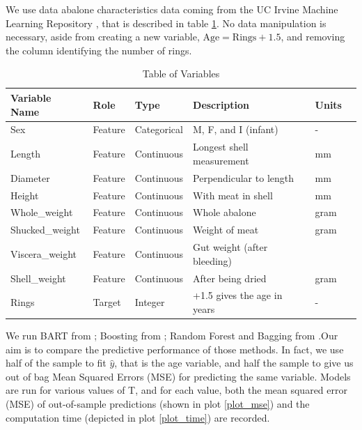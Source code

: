 \documentclass[a4paper,11pt]{article}
\begin{document}
We use data abalone characteristics data coming from the UC Irvine Machine Learning Repository \parencite{warwicknashAbalone1994a}, that is described in table \ref{table1}. No data manipulation is necessary, aside from creating a new variable, \( \text{Age} = \text{Rings} + 1.5 \), and removing the column identifying the number of rings.

\begin{table}[]
  \centering
  \begin{tabular}{llllll}

  \toprule
  Variable Name & Role & Type & Description & Units \\
  \midrule
  Sex                  & Feature       & Categorical   & M, F, and I (infant) & -    \\
  Length               & Feature       & Continuous    & Longest shell measurement & mm\\
  Diameter             & Feature       & Continuous    & Perpendicular to length & mm  \\
  Height               & Feature       & Continuous    & With meat in shell      & mm  \\
  Whole\_weight         & Feature       & Continuous    & Whole abalone           & gram\\
  Shucked\_weight       & Feature       & Continuous    & Weight of meat          & gram\\
  Viscera\_weight       & Feature       & Continuous    & Gut weight (after bleeding) & \\
  Shell\_weight         & Feature       & Continuous    & After being dried       & gram\\
  Rings                & Target        & Integer       & +1.5 gives the age in years & - \\

   \bottomrule
  \end{tabular}
  \caption{Table of Variables}
  \label{table1}
  \end{table}

We run BART from \cite{mccullochBARTBayesianAdditive2024}; Boosting from \cite{ridgewayGbmGeneralizedBoosted2024}; Random Forest and Bagging from \cite{breimanRandomForestBreimanCutlers2024}.Our aim is to compare the predictive performance of those methods. In fact,  we use half of the sample to fit $\hat{y}$, that is the age variable, and half the sample to give us out of bag Mean Squared Errors (MSE) for predicting the same variable. Models are run for various values of T, and for each value, both the mean squared error (MSE) of out-of-sample predictions (shown in plot \ref{plot_mse}) and the computation time (depicted in plot \ref{plot_time}) are recorded.
\end{document}
